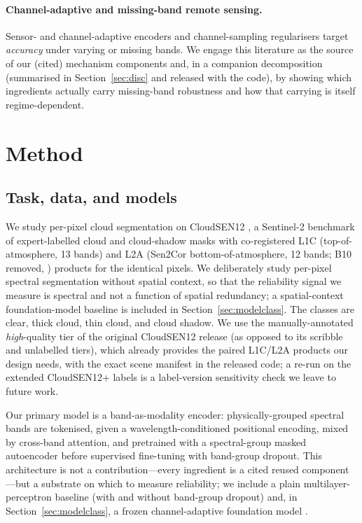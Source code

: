 \documentclass[preprint,3p,times]{elsarticle}
\begin{document}
\paragraph{Channel-adaptive and missing-band remote sensing.} Sensor- and channel-adaptive encoders \citep{xiong2024dofa,waldmann2025panopticon,francis2021sensei} and channel-sampling regularisers \citep{bao2024channelvit,pham2024dichavit} target \emph{accuracy} under varying or missing bands. We engage this literature as the source of our (cited) mechanism components and, in a companion decomposition (summarised in Section~\ref{sec:disc} and released with the code), by showing which ingredients actually carry missing-band robustness and how that carrying is itself regime-dependent.

\section{Method}
\label{sec:method}
\subsection{Task, data, and models}
We study per-pixel cloud segmentation on CloudSEN12 \citep{aybar2022cloudsen12}, a Sentinel-2 benchmark of expert-labelled cloud and cloud-shadow masks with co-registered L1C (top-of-atmosphere, 13 bands) and L2A (Sen2Cor bottom-of-atmosphere, 12 bands; B10 removed, \citealt{mainknorn2017sen2cor}) products for the identical pixels. We deliberately study per-pixel spectral segmentation without spatial context, so that the reliability signal we measure is spectral and not a function of spatial redundancy; a spatial-context foundation-model baseline is included in Section~\ref{sec:modelclass}. The classes are clear, thick cloud, thin cloud, and cloud shadow. We use the manually-annotated \emph{high}-quality tier of the original CloudSEN12 release (as opposed to its scribble and unlabelled tiers), which already provides the paired L1C/L2A products our design needs, with the exact scene manifest in the released code; a re-run on the extended CloudSEN12+ labels is a label-version sensitivity check we leave to future work.

Our primary model is a band-as-modality encoder: physically-grouped spectral bands are tokenised, given a wavelength-conditioned positional encoding, mixed by cross-band attention, and pretrained with a spectral-group masked autoencoder before supervised fine-tuning with band-group dropout. This architecture is not a contribution---every ingredient is a cited reused component---but a substrate on which to measure reliability; we include a plain multilayer-perceptron baseline (with and without band-group dropout) and, in Section~\ref{sec:modelclass}, a frozen channel-adaptive foundation model \citep[DOFA,][]{xiong2024dofa}.
\end{document}
